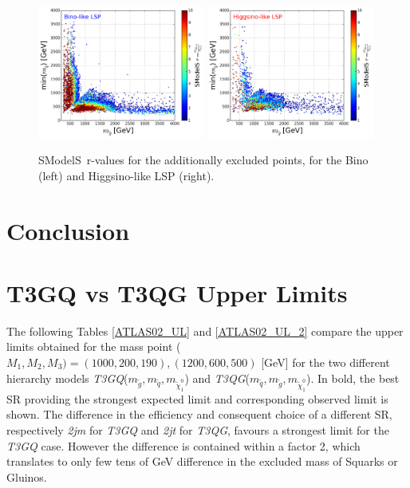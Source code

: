 \documentclass[a4paper,11pt]{article}
\newcommand{\SMO}{{\sc SModelS}}
\begin{document}
\begin{figure}[!]
\begin{center}
\subfigure
\includegraphics[width=0.49\textwidth]{PLOTS/BINO_rValus_Glu_Sq.png}
\subfigure
{\includegraphics[width=0.49\textwidth]{PLOTS/HIGGSINO_rValus_Glu_Sq.png}}
\end{center}
\caption{\SMO~r-values for the additionally excluded points, for the Bino (left) and Higgsino-like LSP (right).} 
\label{rValues}
\end{figure}
%
\section{Conclusion}
%
\acknowledgments
%
\clearpage
\appendix
\section{T3GQ vs T3QG Upper Limits}
The following Tables \ref{ATLAS02_UL} and \ref{ATLAS02_UL_2}  compare the upper limits obtained for the mass point ($M_1,M_2,M_3) = (1000,200,190),(1200,600,500)$ [GeV] for the two different hierarchy models \textit{T3GQ}($m_{\tilde g}, m_{\tilde q}, m_{\tilde \chi _1 ^0 }$) and \textit{T3QG}($m_{\tilde q}, m_{\tilde g}, m_{\tilde \chi _1 ^0 }$). In bold, the best SR providing the strongest expected limit and corresponding observed limit is shown. The difference in the efficiency and consequent choice of a different SR, respectively \textit{2jm} for \textit{T3GQ} and \textit{2jt} for \textit{T3QG}, favours a strongest limit for the \textit{T3GQ} case. However the difference is contained within a factor 2, which translates to only few tens of GeV difference in the excluded mass of Squarks or Gluinos.
\end{document}
